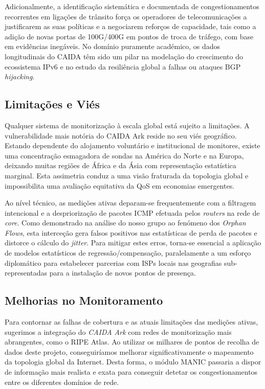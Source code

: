 \documentclass[11pt, a4paper]{article}
\begin{document}
Adicionalmente, a identificação sistemática e documentada de congestionamentos recorrentes em ligações de trânsito força os operadores de telecomunicações a justificarem as suas políticas e a negociarem reforços de capacidade, tais como a adição de novas portas de 100G/400G em pontos de troca de tráfego, com base em evidências inegáveis. No domínio puramente académico, os dados longitudinais do CAIDA têm sido um pilar na modelação do crescimento do ecossistema IPv6 e no estudo da resiliência global a falhas ou ataques BGP \textit{hijacking}.

\subsection{Limitações e Viés}
Qualquer sistema de monitorização à escala global está sujeito a limitações. A vulnerabilidade mais notória do CAIDA Ark reside no seu viés geográfico. Estando dependente do alojamento voluntário e institucional de monitores, existe uma concentração esmagadora de sondas na América do Norte e na Europa, deixando muitas regiões de África e da Ásia com representação estatística marginal. Esta assimetria conduz a uma visão fraturada da topologia global e impossibilita uma avaliação equitativa da QoS em economias emergentes.

Ao nível técnico, as medições ativas deparam-se frequentemente com a filtragem intencional e a despriorização de pacotes ICMP efetuada pelos \textit{routers} na rede de \textit{core}. Como demonstrado na análise do nosso grupo ao fenómeno dos \textit{Orphan Flows}, esta interceção gera falsos positivos nas estatísticas de perda de pacotes e distorce o cálculo do \textit{jitter}. Para mitigar estes erros, torna-se essencial a aplicação de modelos estatísticos de regressão/compensação, paralelamente a um esforço diplomático para estabelecer parcerias com ISPs locais nas geografias sub-representadas para a instalação de novos pontos de presença.

\subsection{Melhorias no Monitoramento}
Para contornar as falhas de cobertura e as atuais limitações das medições ativas, sugerimos a integração do \textit{CAIDA Ark} com redes de monitorização mais abrangentes, como o RIPE Atlas. Ao utilizar os milhares de pontos de recolha de dados deste projeto, conseguiríamos melhorar significativamente o mapeamento da topologia global da Internet. Desta forma, o módulo MANIC passaria a dispor de informação mais realista e exata para conseguir detetar os congestionamentos entre os diferentes domínios de rede.
\end{document}
